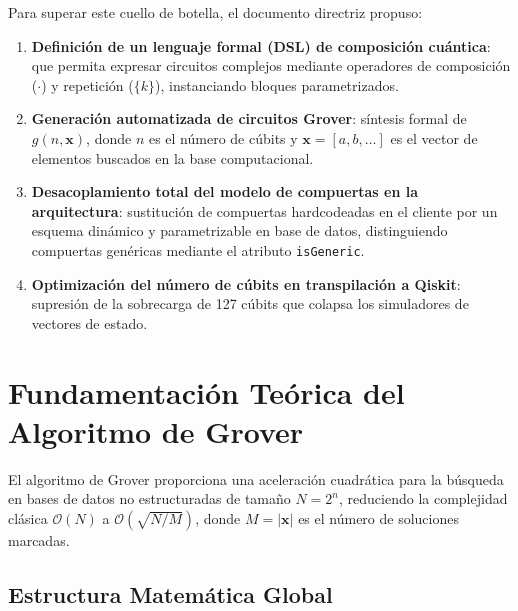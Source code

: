 \documentclass[11pt,a4paper]{article}
\begin{document}
Para superar este cuello de botella, el documento directriz propuso:
\begin{enumerate}
    \item \textbf{Definición de un lenguaje formal (DSL) de composición cuántica}: que permita expresar circuitos complejos mediante operadores de composición ($\cdot$) y repetición ($\{k\}$), instanciando bloques parametrizados.
    \item \textbf{Generación automatizada de circuitos Grover}: síntesis formal de $g(n, \mathbf{x})$, donde $n$ es el número de cúbits y $\mathbf{x} = [a, b, \dots]$ es el vector de elementos buscados en la base computacional.
    \item \textbf{Desacoplamiento total del modelo de compuertas en la arquitectura}: sustitución de compuertas hardcodeadas en el cliente por un esquema dinámico y parametrizable en base de datos, distinguiendo compuertas genéricas mediante el atributo \texttt{isGeneric}.
    \item \textbf{Optimización del número de cúbits en transpilación a Qiskit}: supresión de la sobrecarga de 127 cúbits que colapsa los simuladores de vectores de estado.
\end{enumerate}

\section{Fundamentación Teórica del Algoritmo de Grover}

El algoritmo de Grover proporciona una aceleración cuadrática para la búsqueda en bases de datos no estructuradas de tamaño $N = 2^n$, reduciendo la complejidad clásica $\mathcal{O}(N)$ a $\mathcal{O}(\sqrt{N/M})$, donde $M = |\mathbf{x}|$ es el número de soluciones marcadas.

\subsection{Estructura Matemática Global}
\end{document}
